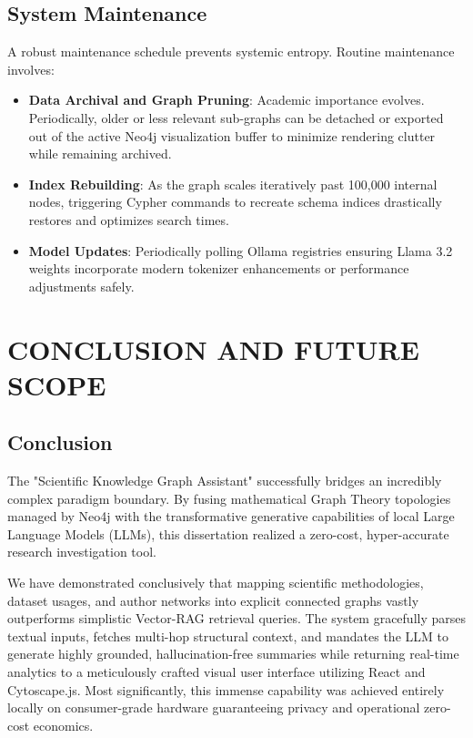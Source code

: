 \documentclass[12pt,a4paper]{report}
\begin{document}
\section{System Maintenance}
A robust maintenance schedule prevents systemic entropy. Routine maintenance involves:
\begin{itemize}
    \item \textbf{Data Archival and Graph Pruning}: Academic importance evolves. Periodically, older or less relevant sub-graphs can be detached or exported out of the active Neo4j visualization buffer to minimize rendering clutter while remaining archived.
    \item \textbf{Index Rebuilding}: As the graph scales iteratively past 100,000 internal nodes, triggering Cypher commands to recreate schema indices drastically restores and optimizes search times.
    \item \textbf{Model Updates}: Periodically polling Ollama registries ensuring Llama 3.2 weights incorporate modern tokenizer enhancements or performance adjustments safely.
\end{itemize}

\chapter{CONCLUSION AND FUTURE SCOPE}
\noindent{\rule{\textwidth}{1.5pt}}

\section{Conclusion}
The "Scientific Knowledge Graph Assistant" successfully bridges an incredibly complex paradigm boundary. By fusing mathematical Graph Theory topologies managed by Neo4j with the transformative generative capabilities of local Large Language Models (LLMs), this dissertation realized a zero-cost, hyper-accurate research investigation tool.

We have demonstrated conclusively that mapping scientific methodologies, dataset usages, and author networks into explicit connected graphs vastly outperforms simplistic Vector-RAG retrieval queries. The system gracefully parses textual inputs, fetches multi-hop structural context, and mandates the LLM to generate highly grounded, hallucination-free summaries while returning real-time analytics to a meticulously crafted visual user interface utilizing React and Cytoscape.js. Most significantly, this immense capability was achieved entirely locally on consumer-grade hardware guaranteeing privacy and operational zero-cost economics.
\end{document}
